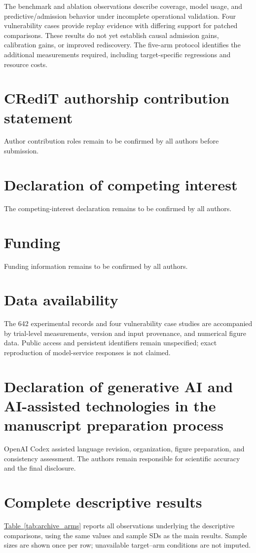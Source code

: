\documentclass[final,5p,times,number]{elsarticle}
\newcommand{\namedref}[2]{\hyperref[#2]{#1~\ref*{#2}}}
\begin{document}
The benchmark and ablation observations describe coverage, model usage, and predictive/admission behavior under incomplete operational validation. Four vulnerability cases provide replay evidence with differing support for patched comparisons. These results do not yet establish causal admission gains, calibration gains, or improved rediscovery. The five-arm protocol identifies the additional measurements required, including target-specific regressions and resource costs.

\section*{CRediT authorship contribution statement}
Author contribution roles remain to be confirmed by all authors before submission.
\section*{Declaration of competing interest}
The competing-interest declaration remains to be confirmed by all authors.
\section*{Funding}
Funding information remains to be confirmed by all authors.
\section*{Data availability}
The 642 experimental records and four vulnerability case studies are accompanied by trial-level measurements, version and input provenance, and numerical figure data. Public access and persistent identifiers remain unspecified; exact reproduction of model-service responses is not claimed.
\section*{Declaration of generative AI and AI-assisted technologies in the manuscript preparation process}
OpenAI Codex assisted language revision, organization, figure preparation, and consistency assessment. The authors remain responsible for scientific accuracy and the final disclosure.

\appendix
\setcounter{table}{0}
\renewcommand{\theHtable}{appendix.\Alph{section}.\arabic{table}}
\section{Complete descriptive results}
\label{sec:archive_appendix}
\namedref{Table}{tab:archive_arms} reports all observations underlying the descriptive comparisons, using the same values and sample SDs as the main results. Sample sizes are shown once per row; unavailable target--arm conditions are not imputed.




\end{document}
